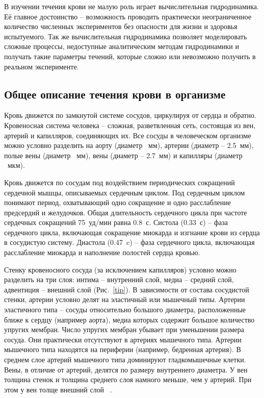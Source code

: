 В изучении течения крови не малую роль играет вычислительная гидродинамика. Её главное достоинство -- возможность проводить практически 
неограниченное количество численных экспериментов без опасности для жизни и здоровья испытуемого. Так же вычислительная гидродинамика 
позволяет моделировать сложные процессы, недоступные аналитическим методам гидродинамики и получать такие параметры течений, которые 
сложно или невозможно получить в реальном эксперименте.

\subsection{Общее описание течения крови в организме}
Кровь движется по замкнутой системе сосудов, циркулируя от сердца и обратно. Кровеносная система человека -- сложная, разветвленная сеть,
состоящая из вен, артерий и капилляров, соединяющих их. Все сосуды в человеческом организме можно условно разделить на аорту (диаметр ~мм), 
артерии (диаметр  -- 2.5~мм), полые вены (диаметр ~мм), вены (диаметр  -- 2.7~мм) и капилляры (диаметр ~мкм).

Кровь движется по сосудам под воздействием периодических сокращений сердечной мышцы, описываемых сердечным циклом. 
Под сердечным циклом понимают период, охватывающий одно сокращение и одно расслабление предсердий и желудочков. 
Общая длительность сердечного цикла при частоте сердечных сокращений 75~уд/мин равна 0.8~с. Систола (0.33~с) -- фаза сердечного цикла, 
включающая сокращение миокарда и изгнание крови из сердца в сосудистую систему. Диастола (0.47~c) -- фаза сердечного цикла, 
включающая расслабление миокарда и наполнение полостей сердца кровью.

Стенку кровеносного сосуда (за исключением капилляров) условно можно разделить на три слоя: интима -- внутренний слой, 
медиа -- средний слой, адвентиция -- внешний слой (Рис.~\ref{tip}).
В зависимости от состава сосудистой стенки, артерии условно делят на эластичный или мышечный типы. 
Артерии эластичного типа -- сосуды относительно большого диаметра, расположенные ближе к сердцу (например аорта), 
медиа которых содержит большое количество упругих мембран. Число упругих мембран убывает при уменьшении размера сосуда. 
Они практически отсутствуют в артериях мышечного типа. Артерии мышечного типа находятся на периферии (например, бедренная артерия). 
В среднем слое артерий мышечного типа доминируют гладкомышечные клетки. Вены, в отличие от артерий, делятся по размеру внутреннего 
диаметра. У вен толщина стенок и толщина среднего слоя намного меньше, чем у артерий. При этом у вен толще внешний слой ~\cite{Rhodin:1980}. 

